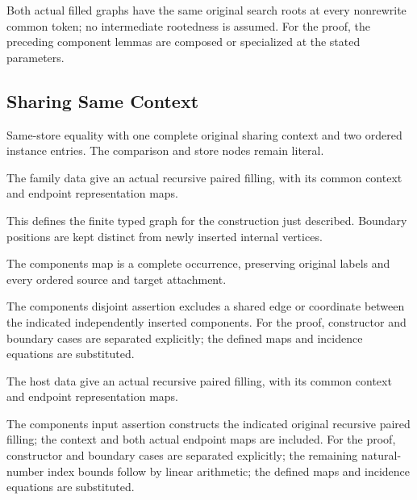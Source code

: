 Both actual filled graphs have the same original search roots at every nonrewrite common token; no intermediate rootedness is assumed.
For the proof, the preceding component lemmas are composed or specialized at the stated parameters.
\par{}

\subsection{Sharing Same Context}
Same-store equality with one complete original sharing context and two ordered instance entries. The comparison and store nodes remain literal.

The family data give an actual recursive paired filling, with its common context and endpoint representation maps.
\par{}

This defines the finite typed graph for the construction just described. Boundary positions are kept distinct from newly inserted internal vertices.
\par{}

The components map is a complete occurrence, preserving original labels and every ordered source and target attachment.
\par{}

The components disjoint assertion excludes a shared edge or coordinate between the indicated independently inserted components.
For the proof, constructor and boundary cases are separated explicitly; the defined maps and incidence equations are substituted.
\par{}

The host data give an actual recursive paired filling, with its common context and endpoint representation maps.
\par{}

The components input assertion constructs the indicated original recursive paired filling; the context and both actual endpoint maps are included.
For the proof, constructor and boundary cases are separated explicitly; the remaining natural-number index bounds follow by linear arithmetic; the defined maps and incidence equations are substituted.
\par{}

